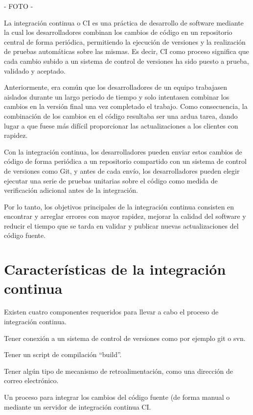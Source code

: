 - FOTO - 

La integración continua o CI es una práctica de desarrollo de software mediante la cual los desarrolladores combinan los cambios de código en un repositorio central de forma periódica, permitiendo la ejecución de versiones y la realización de pruebas automáticas sobre las mismas. Es decir, CI como proceso significa que cada cambio subido a un sistema de control de versiones ha sido puesto a prueba, validado y aceptado.

Anteriormente, era común que los desarrolladores de un equipo trabajasen aislados durante un largo periodo de tiempo y solo intentasen combinar los cambios en la versión final una vez completado el trabajo. Como consecuencia, la combinación de los cambios en el código resultaba ser una ardua tarea, dando lugar a que fuese más difícil proporcionar las actualizaciones a los clientes con rapidez.

Con la integración continua, los desarrolladores pueden enviar estos cambios de código de forma periódica a un repositorio compartido con un sistema de control de versiones como Git, y antes de cada envío, los desarrolladores pueden elegir ejecutar una serie de pruebas unitarias sobre el código como medida de verificación adicional antes de la integración.

Por lo tanto, los objetivos principales de la integración continua consisten en encontrar y arreglar errores con mayor rapidez, mejorar la calidad del software y reducir el tiempo que se tarda en validar y publicar nuevas actualizaciones del código fuente.

\section{Características de la integración continua}
Existen cuatro componentes requeridos para llevar a cabo el proceso de integración continua.
\begin{compactitem}
    \item Tener conexión a un sistema de control de versiones como por ejemplo git o svn.
    \item Tener un script de compilación “build”.
    \item Tener algún tipo de mecanismo de retroalimentación, como una dirección de correo electrónico.
    \item Un proceso para integrar los cambios del código fuente (de forma manual o mediante un servidor de integración continua CI.
\end{compactitem}

